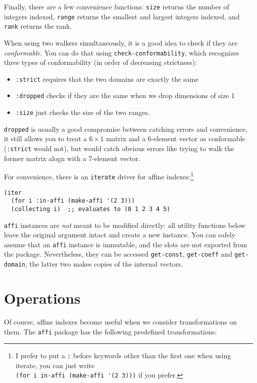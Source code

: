 \documentclass[letterpaper,11pt]{article}
\begin{document}
Finally, there are a few convenience functions: \lstinline!size!
returns the number of integers indexed, \lstinline!range! returns the
smallest and largest integers indexed, and \lstinline!rank! returns
the rank.

When using two walkers simultaneously, it is a good idea to check if
they are \emph{conformable}.  You can do that using
\lstinline!check-conformability!, which recognizes three types of
conformability (in order of decreasing strictness):
\begin{itemize}
\item \lstinline!:strict! requires that the two domains are exactly
  the same
\item \lstinline!:dropped! checks if they are the same when we drop
  dimensions of size 1
\item \lstinline!:size! just checks the size of the two ranges.
\end{itemize}
\lstinline!dropped! is usually a good compromise between catching
errors and convenience, it still allows you to treat a $6\times1$
matrix and a 6-element vector as conformable (\lstinline!:strict! would
not), but would catch obvious errors like trying to walk the former
matrix alogn with a 7-element vector.

For convenience, there is an \lstinline!iterate! driver for affine
indexes:\footnote{I prefer to put a \lstinline!:! before keywords
  other than the first one when using iterate, you can just write\\
  \lstinline!(for i in-affi (make-affi '(2 3)))! if you prefer.}
\begin{lstlisting}
(iter
  (for i :in-affi (make-affi '(2 3)))
  (collecting i)  ;; evaluates to (0 1 2 3 4 5)
\end{lstlisting}


\lstinline!affi! instances are \emph{not} meant to be modified
directly: all utility functions below leave the original argument
intact and create a new instance.  You can safely assume that an
\lstinline!affi! instance is immutable, and the slots are not exported
from the package.  Nevertheless, they can be accessed
\lstinline!get-const!, \lstinline!get-coeff! and
\lstinline!get-domain!, the latter two makes copies of the internal
vectors.

\section{Operations}
\label{sec:operations}

Of course, affine indexes become useful when we consider
transformations on them.  The \lstinline!affi! package has the
following predefined transformations:
\end{document}
